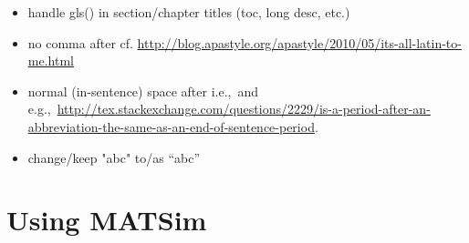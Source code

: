 \begin{itemize}
\item handle gls() in section/chapter titles (toc, long desc, etc.)

\item no comma after cf. \url{http://blog.apastyle.org/apastyle/2010/05/its-all-latin-to-me.html}

\item normal (in-sentence) space after i.e.,\ and e.g.,\ \url{http://tex.stackexchange.com/questions/2229/is-a-period-after-an-abbreviation-the-same-as-an-end-of-sentence-period}.

\item change/keep "abc" to/as ``abc''

\end{itemize}

\vfill\eject

\lstset{language=Java}


\createtitlepage
{}

 \cleardoublepage

{\parskip0pt %
\tableofcontents \cleardoublepage
}

 \cleardoublepage



 \cleardoublepage

 \cleardoublepage




\part{Using MATSim} \cleardoublepage
 \cleardoublepage
 \cleardoublepage
 \cleardoublepage
 \cleardoublepage

